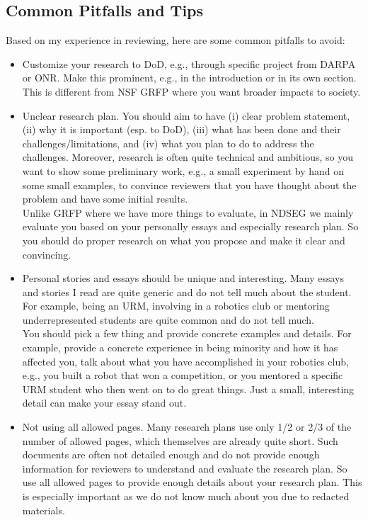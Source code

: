 \documentclass[oneside,11pt,dvipsnames]{book}
\begin{document}
\subsection{Common Pitfalls and Tips}
Based on my experience in reviewing, here are some common pitfalls to avoid:
\begin{itemize}

    \item Customize your research to DoD, e.g., through specific project from DARPA or ONR. 
    Make this prominent, e.g., in the introduction or in its own section.  This is different from NSF GRFP where you want broader impacts to society.

    \item Unclear research plan. 
     You should aim to have (i) clear problem statement, (ii) why it is important (esp. to DoD), (iii) what has been done and their challenges/limitations, and (iv) what you plan to do to address the challenges.  Moreover, research is often quite technical and ambitious, so you want to show some preliminary work, e.g., a small experiment by hand on some small examples, to convince reviewers that you have thought about the problem and have some initial results.\\
    
    
    Unlike GRFP where we have more things to evaluate, in NDSEG we mainly evaluate you based on your personally essays and especially research plan. So you should do proper research on what you propose and make it clear and convincing.

    \item Personal stories and essays should be unique and interesting. Many essays and stories I read are quite generic and do not tell much about the student. For example, being an URM, involving in a robotics club or mentoring underrepresented students are quite common and do not tell much.\\
    
    You should pick a few thing and provide concrete examples and details.  For example, provide a concrete experience in being minority and how it has affected you, talk about what you have accomplished in your robotics club, e.g., you built a robot that won a competition, or you mentored a specific URM student who then went on to do great things.  Just a small, interesting detail can make your essay stand out.
    
    \item Not using all allowed pages. Many research plans use only 1/2 or 2/3 of the number of allowed pages, which themselves are already quite short. Such documents are often not detailed enough and do not provide enough information for reviewers to understand and evaluate the research plan.  So use all allowed pages to provide enough details about your research plan. This is especially important as we do not know much about you due to redacted materials.
    

\end{itemize}
\end{document}
